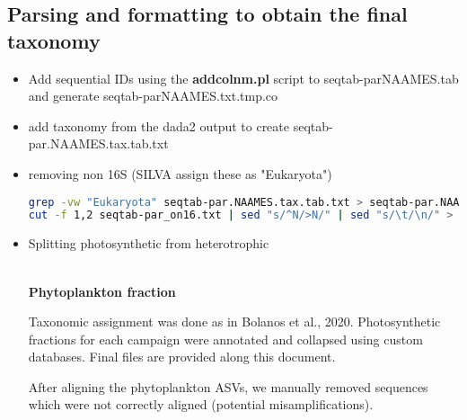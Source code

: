 \documentclass{article}
\begin{document}
\subsection{Parsing and formatting to obtain the final taxonomy}
\begin{itemize}
\item Add sequential IDs using the \textbf{addcolnm.pl} script to seqtab-parNAAMES.tab and generate seqtab-parNAAMES.txt.tmp.co

\item{add taxonomy from the dada2 output to create seqtab-par.NAAMES.tax.tab.txt}

\item{removing non 16S (SILVA assign these as "Eukaryota")}
\begin{lstlisting}[language=bash]
grep -vw "Eukaryota" seqtab-par.NAAMES.tax.tab.txt > seqtab-par.NAAMESclean.tax.tab.txt
cut -f 1,2 seqtab-par_on16.txt | sed "s/^N/>N/" | sed "s/\t/\n/" > seqtab-par.NAAMESclean.tax.tab.fa
\end{lstlisting}

\item{Splitting photosynthetic from heterotrophic}\\
\\
\centerline{\bfseries Phytoplankton fraction}
Taxonomic assignment was done as in Bolanos et al., 2020. Photosynthetic fractions for each campaign were annotated and collapsed using custom databases. Final files are provided along this document.

After aligning the phytoplankton ASVs, we manually removed sequences which were not correctly aligned (potential misamplifications). 


\end{itemize}
\end{document}
